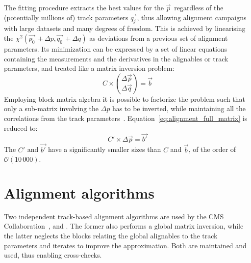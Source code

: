 The fitting procedure extracts the best values for the $\vec{p}\,$ regardless of the (potentially millions of) track parameters $\vec{q_j}\,$,
thus allowing alignment campaigns with large datasets and many degrees of freedom.
This is achieved by linearising the $\chi^2(\vec{p_0}\,+\Delta p, \vec{q_0}\,+\Delta q)$ as deviations from a previous set of alignment parameters.
Its minimization can be expressed by a set of linear equations containing the measurements and the derivatives in the alignables or track parameters,
and treated like a matrix inversion problem:
\begin{equation}
  \label{eq:alignment_full_matrix}
  C \times \binom{\Delta\vec{p}}{\Delta\vec{q}} = \vec{b}
\end{equation}
Employing block matrix algebra it is possible to factorize the problem such that only a sub-matrix involving the $\Delta p$ has to be inverted,
while maintaining all the correlations from the track parameters~\cite{blobel2002new}.
Equation~\ref{eq:alignment_full_matrix} is reduced to:
\begin{equation}
  \label{eq:alignment_reduced_matrix}
  C' \times \Delta\vec{p} = \vec{b'}
\end{equation}
The $C'$ and $\vec{b'}$ have a significantly smaller sizes than $C$ and $\vec{b}$,
of the order of $\mathcal{O}(10\,000)$.

\section{Alignment algorithms}
Two independent track-based alignment algorithms are used by the CMS Collaboration~\cite{CMS-TRK-20-001}, \MPII and \HIPPY.
The former also performs a global matrix inversion, while the latter neglects the blocks
relating the global alignables to the track parameters and iterates to improve the approximation.
Both are maintained and used, thus enabling cross-checks.

